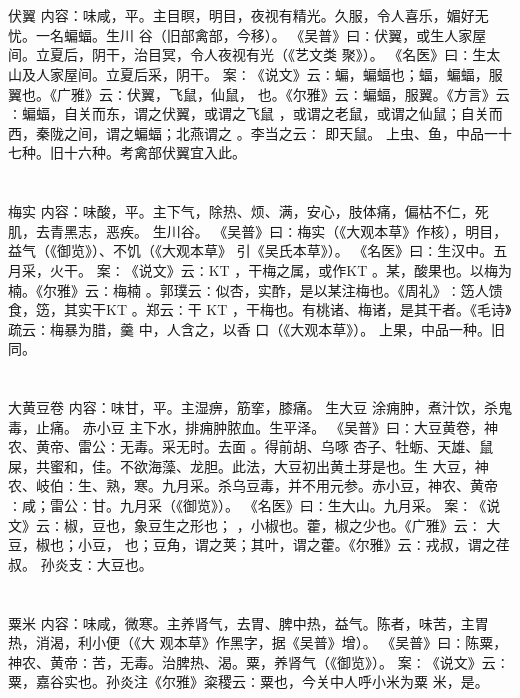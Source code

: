 \documentclass[12pt,UTF8]{ctexbook}
\begin{document}
\chapter{}伏翼
内容：味咸，平。主目瞑，明目，夜视有精光。久服，令人喜乐，媚好无忧。一名蝙蝠。生川 
谷（旧部禽部，今移）。 
《吴普》曰∶伏翼，或生人家屋间。立夏后，阴干，治目冥，令人夜视有光（《艺文类 
聚》）。 
《名医》曰∶生太山及人家屋间。立夏后采，阴干。 
案∶《说文》云∶蝙，蝙蝠也；蝠，蝙蝠，服翼也。《广雅》云∶伏翼，飞鼠，仙鼠， 
也。《尔雅》云∶蝙蝠，服翼。《方言》云∶蝙蝠，自关而东，谓之伏翼，或谓之飞鼠 
，或谓之老鼠，或谓之仙鼠；自关而西，秦陇之间，谓之蝙蝠；北燕谓之 。李当之云∶ 
即天鼠。 
上虫、鱼，中品一十七种。旧十六种。考禽部伏翼宜入此。 


\chapter{}梅实
内容：味酸，平。主下气，除热、烦、满，安心，肢体痛，偏枯不仁，死肌，去青黑志，恶疾。 
生川谷。 
《吴普》曰∶梅实（《大观本草》作核），明目，益气（《御览》）、不饥（《大观本草》 
引《吴氏本草》）。 
《名医》曰∶生汉中。五月采，火干。 
案∶《说文》云∶KT ，干梅之属，或作KT 。某，酸果也。以梅为楠。《尔雅》云∶梅楠 
。郭璞云∶似杏，实酢，是以某注梅也。《周礼》∶笾人馈食，笾，其实干KT 。郑云∶干 
KT 
，干梅也。有桃诸、梅诸，是其干者。《毛诗》疏云∶梅暴为腊，羹 中，人含之，以香 
口（《大观本草》）。 
上果，中品一种。旧同。 


\chapter{}大黄豆卷
内容：味甘，平。主湿痹，筋挛，膝痛。 
生大豆 涂痈肿，煮汁饮，杀鬼毒，止痛。 
赤小豆 主下水，排痈肿脓血。生平泽。 
《吴普》曰∶大豆黄卷，神农、黄帝、雷公∶无毒。采无时。去面 。得前胡、乌啄 
杏子、牡蛎、天雄、鼠屎，共蜜和，佳。不欲海藻、龙胆。此法，大豆初出黄土芽是也。生 
大豆，神农、岐伯∶生、熟，寒。九月采。杀乌豆毒，并不用元参。赤小豆，神农、黄帝 
∶咸；雷公∶甘。九月采（《御览》）。 
《名医》曰∶生大山。九月采。 
案∶《说文》云∶椒，豆也，象豆生之形也； ，小椒也。藿，椒之少也。《广雅》云∶ 
大豆，椒也；小豆， 也；豆角，谓之荚；其叶，谓之藿。《尔雅》云∶戎叔，谓之荏叔。 
孙炎支∶大豆也。 


\chapter{}粟米
内容：味咸，微寒。主养肾气，去胃、脾中热，益气。陈者，味苦，主胃热，消渴，利小便（《大 
观本草》作黑字，据《吴普》增）。 
《吴普》曰∶陈粟，神农、黄帝∶苦，无毒。治脾热、渴。粟，养肾气（《御览》）。 
案∶《说文》云∶粟，嘉谷实也。孙炎注《尔雅》粢稷云∶粟也，今关中人呼小米为粟 
米，是。 
\end{document}
